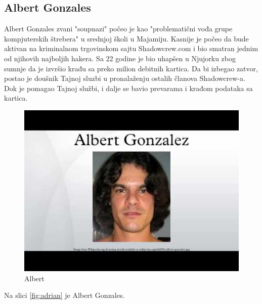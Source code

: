 \documentclass[a4paper]{article}
\begin{document}
\subsection{Albert Gonzales}
Albert Gonzales zvani "soupnazi" počeo je kao "problematični vođa grupe kompjuterskih štrebera" u srednjoj školi u Majamiju. Kasnije je počeo da bude aktivan na kriminalnom trgovinskom sajtu Shadowcrew.com i bio smatran jednim od njihovih najboljih hakera. Sa 22 godine je bio uhapšen u Njujorku zbog sumnje da je izvršio krađu sa preko milion debitnih kartica. Da bi izbegao zatvor, postao je doušnik Tajnoj sluzbi u pronalaženju ostalih članova Shadowcrew-a. Dok je pomagao Tajnoj službi, i dalje se bavio prevarama i krađom podataka sa kartica.
\begin{figure}[h!]
	\begin{center}
		\includegraphics[scale=0.25]{albert.jpg}
	\end{center}
	\caption{Albert}
	\label{fig:albert}
\end{figure}

Na slici \ref{fig:adrian} je Albert Gonzales.
\end{document}
